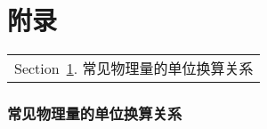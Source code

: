 \part{附录}\label{Part:Appendix}
	
		\begin{margintable}\vspace{1.4in}\footnotesize
			\begin{tabularx}{\marginparwidth}{|X}
			Section~\ref{sec:Dimensional}. 常见物理量的单位换算关系\\
			\end{tabularx}
		\end{margintable}

		\section{常见物理量的单位换算关系}\label{sec:Dimensional}

